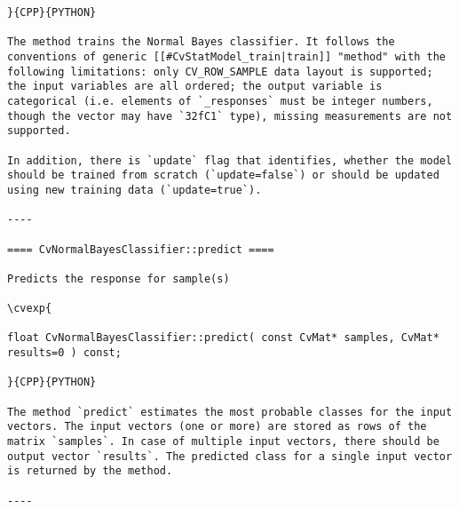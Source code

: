 \begin{verbatim}
}{CPP}{PYTHON}

The method trains the Normal Bayes classifier. It follows the conventions of generic [[#CvStatModel_train|train]] "method" with the following limitations: only CV_ROW_SAMPLE data layout is supported; the input variables are all ordered; the output variable is categorical (i.e. elements of `_responses` must be integer numbers, though the vector may have `32fC1` type), missing measurements are not supported.

In addition, there is `update` flag that identifies, whether the model should be trained from scratch (`update=false`) or should be updated using new training data (`update=true`).

----

==== CvNormalBayesClassifier::predict ====

Predicts the response for sample(s)

\cvexp{

float CvNormalBayesClassifier::predict( const CvMat* samples, CvMat* results=0 ) const;

}{CPP}{PYTHON}

The method `predict` estimates the most probable classes for the input vectors. The input vectors (one or more) are stored as rows of the matrix `samples`. In case of multiple input vectors, there should be output vector `results`. The predicted class for a single input vector is returned by the method.

----

\end{verbatim}
